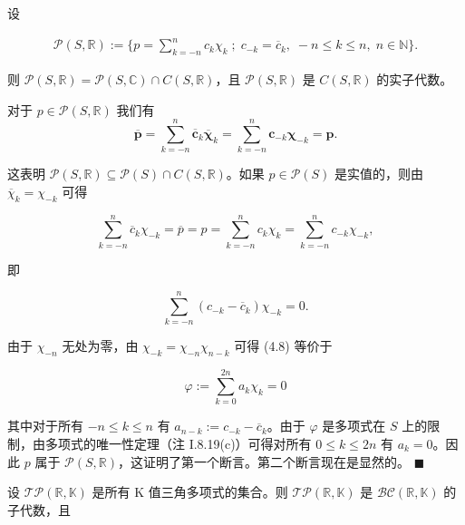\begin{remark}

\begin{items}
\item

设

\begin{equation*}
\begin{array}{r}{\mathcal{P}(S,\mathbb{R}):=\big\{p=\sum_{k=-n}^{n}c_{k}\chi_{k}\;;\;c_{-k}=\overline{{c}}_{k},\;-n\le k\le n,\;n\in\mathbb{N}\big\}.}\end{array}
\end{equation*}

则  $\mathcal{P}(S,\mathbb{R}) = \mathcal{P}(S,\mathbb{C}) \cap C(S,\mathbb{R})$，且  $\mathcal{P}(S,\mathbb{R})$ 是  $C(S,\mathbb{R})$ 的实子代数。

\proofhead
对于  $p \in \mathcal{P}(S, \mathbb{R})$ 我们有
\[
\overline{{\boldsymbol{p}}}=\sum_{k=-n}^{n}\overline{{\boldsymbol{c}}}_{k}\overline{{\boldsymbol{\chi}}}_{k}=\sum_{k=-n}^{n}\boldsymbol{c}_{-k}\boldsymbol{\chi}_{-k}=\boldsymbol{p}.
\]

这表明  $\mathcal{P}(S,\mathbb{R}) \subseteq \mathcal{P}(S) \cap C(S,\mathbb{R})$。如果  $p \in \mathcal{P}(S)$ 是实值的，则由  $\overline{\chi}_k = \chi_{-k}$ 可得

\[
\sum_{k=-n}^{n}\overline{c}_{k}\chi_{-k}=\overline{p}=p=\sum_{k=-n}^{n}c_{k}\chi_{k}=\sum_{k=-n}^{n}c_{-k}\chi_{-k},
\]

即

\begin{equation}
\sum_{k=-n}^{n}(c_{-k}-\overline{c}_{k})\chi_{-k}=0.
\end{equation}

由于  $\chi_{-n}$ 无处为零，由  $\chi_{-k} = \chi_{-n} \chi_{n-k}$ 可得 (4.8) 等价于

\begin{equation}
\varphi:=\sum_{k=0}^{2n}a_{k}\chi_{k}=0
\end{equation}

其中对于所有  $-n \leq k \leq n$ 有  $a_{n-k} := c_{-k} - \overline{c}_k$。由于  $\varphi$ 是多项式在  $S$ 上的限制，由多项式的唯一性定理（注 I.8.19(c)）可得对所有  $0 \leq k \leq 2n$ 有  $a_k = 0$。因此  $p$ 属于  $\mathcal{P}(S, \mathbb{R})$，这证明了第一个断言。第二个断言现在是显然的。 $ \blacksquare $

\item

设  $\mathcal{TP}(\mathbb{R},\mathbb{K})$ 是所有 K 值三角多项式的集合。则  $\mathcal{TP}(\mathbb{R},\mathbb{K})$ 是  $\mathcal{BC}(\mathbb{R},\mathbb{K})$ 的子代数，且


\end{items}
\end{remark}
